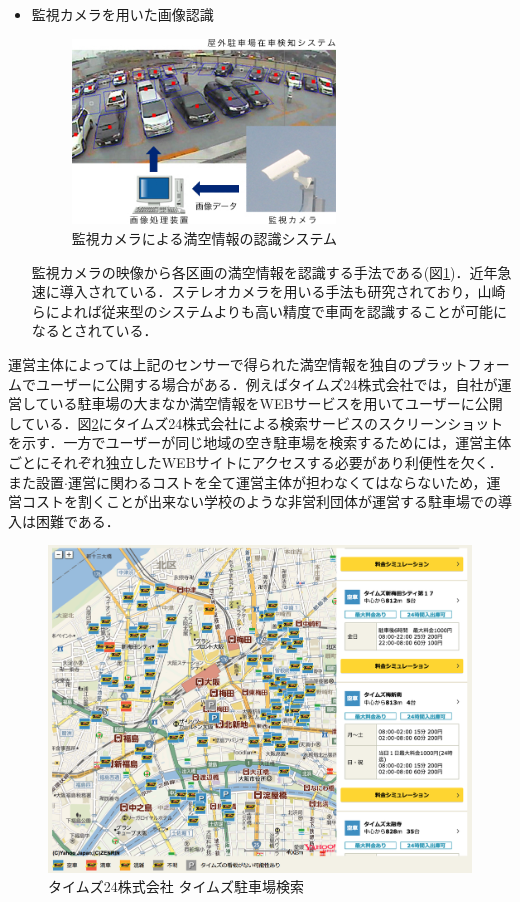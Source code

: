 \begin{itemize}
	\item 監視カメラを用いた画像認識\\
	      \begin{figure}
	      	\centering
	      	\includegraphics[width=7cm]{fig/camera.png}
	      	\caption{監視カメラによる満空情報の認識システム\protect \footnotemark}
	      	\label{camera}
	      \end{figure}
	      監視カメラの映像から各区画の満空情報を認識する手法である(図\ref{camera})．近年急速に導入されている．ステレオカメラを用いる手法も研究されており，山崎ら\cite{Yamazaki}によれば従来型のシステムよりも高い精度で車両を認識することが可能になるとされている．
\end{itemize}

運営主体によっては上記のセンサーで得られた満空情報を独自のプラットフォームでユーザーに公開する場合がある．例えばタイムズ24株式会社では，自社が運営している駐車場の大まなか満空情報をWEBサービスを用いてユーザーに公開している\cite{times}．図\ref{times-fig}にタイムズ24株式会社による検索サービスのスクリーンショットを示す．一方でユーザーが同じ地域の空き駐車場を検索するためには，運営主体ごとにそれぞれ独立したWEBサイトにアクセスする必要があり利便性を欠く．また設置$\cdot$運営に関わるコストを全て運営主体が担わなくてはならないため，運営コストを割くことが出来ない学校のような非営利団体が運営する駐車場での導入は困難である．


\begin{figure}
	\centering
	\includegraphics[width=12cm]{fig/times-fig.png}
	\caption{タイムズ24株式会社 タイムズ駐車場検索 \protect \footnotemark}
	\label{times-fig}
\end{figure}

